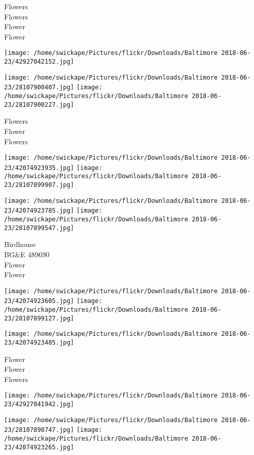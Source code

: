\documentclass[10pt,letterpaper]{article}
\begin{document}
Flowers\\
Flowers\\
Flower\\
Flower
\pagebreak

\texttt{[image: /home/swickape/Pictures/flickr/Downloads/Baltimore 2018-06-23/42927042152.jpg]}

\vspace{0.25in}
\texttt{[image: /home/swickape/Pictures/flickr/Downloads/Baltimore 2018-06-23/28107900407.jpg]}
\texttt{[image: /home/swickape/Pictures/flickr/Downloads/Baltimore 2018-06-23/28107900227.jpg]}

Flowers\\
Flower\\
Flowers
\pagebreak

\texttt{[image: /home/swickape/Pictures/flickr/Downloads/Baltimore 2018-06-23/42074923935.jpg]}
\texttt{[image: /home/swickape/Pictures/flickr/Downloads/Baltimore 2018-06-23/28107899907.jpg]}

\texttt{[image: /home/swickape/Pictures/flickr/Downloads/Baltimore 2018-06-23/42074923785.jpg]}
\texttt{[image: /home/swickape/Pictures/flickr/Downloads/Baltimore 2018-06-23/28107899547.jpg]}

Birdhouse\\
BG\&E 489690\\
Flower\\
Flower
\pagebreak

\texttt{[image: /home/swickape/Pictures/flickr/Downloads/Baltimore 2018-06-23/42074923605.jpg]}
\texttt{[image: /home/swickape/Pictures/flickr/Downloads/Baltimore 2018-06-23/28107899127.jpg]}

\texttt{[image: /home/swickape/Pictures/flickr/Downloads/Baltimore 2018-06-23/42074923485.jpg]}

Flower\\
Flower\\
Flowers
\pagebreak

\texttt{[image: /home/swickape/Pictures/flickr/Downloads/Baltimore 2018-06-23/42927041942.jpg]}

\vspace{0.25in}
\texttt{[image: /home/swickape/Pictures/flickr/Downloads/Baltimore 2018-06-23/28107898747.jpg]}
\texttt{[image: /home/swickape/Pictures/flickr/Downloads/Baltimore 2018-06-23/42074923265.jpg]}
\end{document}
